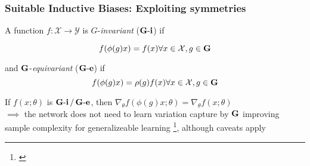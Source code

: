 \documentclass[./presentation.tex]{subfiles}
\begin{document}
\begin{frame}[label=gggback,t]
  \frametitle{Suitable Inductive Biases: Exploiting symmetries}
  A function $f:\mathcal{X}\to\mathcal{Y}$ is $G$-\emph{invariant} ($\operatorname{\mathbf{G-i}}$) if 

    \begin{equation}
  f(\phi(g)x)=f(x)\forall x \in \mathcal{X},g\in \operatorname{\mathbf{G}}\nonumber
    \end{equation}

  and $\operatorname{\mathbf{G}}$-\emph{equivariant} ($\operatorname{\mathbf{G-e}}$) if
  \begin{equation}
  f(\phi(g)x)=\rho(g)f(x) \forall x \in\mathcal{X},g\in \operatorname{\mathbf{G}}\nonumber
  \end{equation}

  If $f(x;\theta)$ is $\operatorname{\mathbf{G-i}}/\operatorname{\mathbf{G-e}}$, then $\nabla_\theta f(\phi(g)x;\theta)=\nabla_\theta f(x;\theta)$\\

  $\implies$ the network does not need to learn variation capture by $\operatorname{\mathbf{G}}$ improving sample complexity for generalizeable learning
  \footnote[frame]{\cite{elesedyProvablyStrictGeneralisation2021b}}, although caveats apply
\end{frame}
\end{document}
